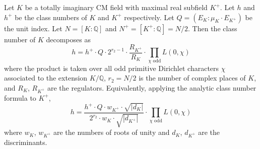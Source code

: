 Let $K$ be a totally imaginary CM field with maximal real subfield $K^+$. Let $h$ and $h^+$ be the class numbers of $K$ and $K^+$ respectively. Let $Q = (E_K : \mu_K \cdot E_{K^+})$ be the unit index. Let $N = [K : \mathbb{Q}]$ and $N^+ = [K^+ : \mathbb{Q}] = N/2$. Then the class number of $K$ decomposes as
$$h = h^+ \cdot Q \cdot 2^{r_2 - 1} \cdot \frac{R_{K^+}}{R_K} \cdot \prod_{\chi \text{ odd}} L(0, \chi)$$
where the product is taken over all odd primitive Dirichlet characters $\chi$ associated to the extension $K/\mathbb{Q}$, $r_2 = N/2$ is the number of complex places of $K$, and $R_K$, $R_{K^+}$ are the regulators. Equivalently, applying the analytic class number formula to $K^+$,
$$h = \frac{h^+ \cdot Q \cdot w_{K^+} \cdot \sqrt{|d_K|}}{2^{r_2} \cdot w_K \cdot \sqrt{|d_{K^+}|}} \cdot \prod_{\chi \text{ odd}} L(0, \chi)$$
where $w_K$, $w_{K^+}$ are the numbers of roots of unity and $d_K$, $d_{K^+}$ are the discriminants.
